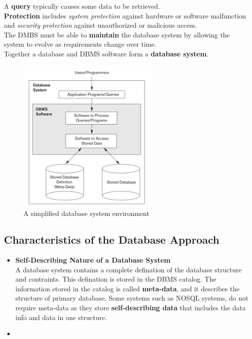 A \textbf{query} typically causes some data to be retrieved.\\

\textbf{Protection} includes \textit{system protection} against
hardware or software malfunction and \textit{security protection}
against unauthorized or malicious access.\\

The DMBS must be able to \textbf{maintain} the database system by
allowing the system to evolve as requirements change over time.\\

Together a database and DBMS software form a \textbf{database
system}.

\begin{figure}[h!]
    \begin{center}
        \includegraphics[width=7cm]{fig1.png}
        \caption{A simplified database system environment}
    \end{center}
\end{figure}

\subsection{Characteristics of the Database Approach}

\begin{itemize}
    \item \textbf{Self-Describing Nature of a Database System}\\
        A database system contains a complete defination of
        the database structure and contraints. This defination
        is stored in the DBMS catalog. The information stored
        in the catalog is called \textbf{meta-data}, and it
        describes the structure of primary database. Some systems
        such as NOSQL systems, do not require meta-data as they
        store \textbf{self-describing data} that includes the
        data info and data in one structure.

    \item
\end{itemize}
